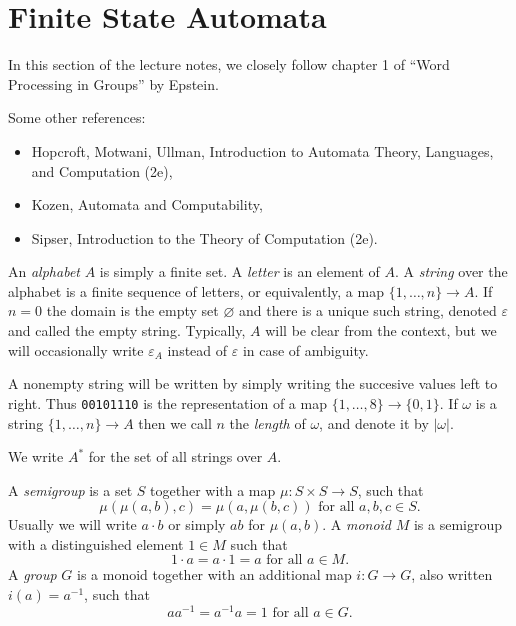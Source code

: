 \section{Finite State Automata}

In this section of the lecture notes, we closely follow chapter 1 of
``Word Processing in Groups'' by Epstein.

Some other references:

\begin{itemize}
    \item Hopcroft, Motwani, Ullman, Introduction to Automata Theory,
        Languages, and Computation (2e),
    \item Kozen, Automata and Computability,
    \item Sipser, Introduction to the Theory of Computation (2e).
\end{itemize}

\begin{defns} An \emph{alphabet} $A$ is simply a finite set.  A
    \emph{letter} is an element of $A$. A \emph{string} over the
    alphabet is a finite sequence of letters, or equivalently, a map
    $\{1, \dots, n\} \rightarrow A.$ If $n=0$ the domain is the empty
    set $\varnothing$ and there is a unique such string, denoted
    $\varepsilon$ and called the empty string. Typically, $A$ will be
    clear from the context, but we will occasionally write
    $\varepsilon_A$ instead of $\varepsilon$ in case of ambiguity.

    A nonempty string will be written by simply writing the succesive
    values left to right. Thus \texttt{00101110} is the representation
    of a map $\{1,\dots,8\}\rightarrow \{0,1\}.$ If $\omega$ is a
    string $\{1,\dots,n\} \rightarrow A$ then we call $n$ the
    \emph{length} of $\omega$, and denote it by $|\omega|$.

    We write $A^*$ for the set of all strings over $A$.
\end{defns}

\begin{defns} A \emph{semigroup} is a set $S$ together with a map $\mu
    : S\times S \rightarrow S$, such that $$\mu(\mu(a,b),c) =
    \mu(a,\mu(b,c)) \text{ for all } a,b,c\in S.$$ Usually we will
    write $a\cdot b$ or simply $ab$ for $\mu(a,b)$. A \emph{monoid}
    $M$ is a semigroup with a distinguished element $1\in M$ such that
    \[1\cdot a = a \cdot 1 = a \text{ for all } a\in M.\] A
    \emph{group} $G$ is a monoid together with an additional map $i :
    G \rightarrow G$, also written $i(a) = a^{-1}$, such that \[a
    a^{-1} = a^{-1} a = 1 \text{ for all } a \in G.\]
\end{defns}

